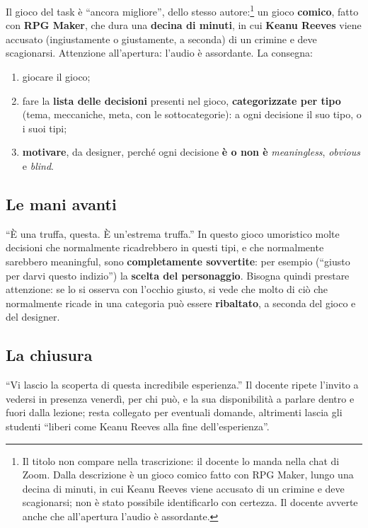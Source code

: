 Il gioco del task è ``ancora migliore'', dello stesso autore:\footnote{Il
titolo non compare nella trascrizione: il docente lo manda nella chat di
Zoom. Dalla descrizione è un gioco comico fatto con RPG Maker, lungo una
decina di minuti, in cui Keanu Reeves viene accusato di un crimine e deve
scagionarsi; non è stato possibile identificarlo con certezza. Il docente
avverte anche che all'apertura l'audio è assordante.} un gioco
\textbf{comico}, fatto con \textbf{RPG Maker}, che dura una
\textbf{decina di minuti}, in cui \textbf{Keanu Reeves} viene accusato
(ingiustamente o giustamente, a seconda) di un crimine e deve scagionarsi.
Attenzione all'apertura: l'audio è assordante. La consegna:
\begin{enumerate}
  \item giocare il gioco;
  \item fare la \textbf{lista delle decisioni} presenti nel gioco,
        \textbf{categorizzate per tipo} (tema, meccaniche, meta, con le
        sottocategorie): a ogni decisione il suo tipo, o i suoi tipi;
  \item \textbf{motivare}, da designer, perché ogni decisione \textbf{è o
        non è} \emph{meaningless}, \emph{obvious} e \emph{blind}.
\end{enumerate}

\subsection{Le mani avanti}

``È una truffa, questa. È un'estrema truffa.'' In questo gioco umoristico
molte decisioni che normalmente ricadrebbero in questi tipi, e che
normalmente sarebbero meaningful, sono \textbf{completamente sovvertite}:
per esempio (``giusto per darvi questo indizio'') la \textbf{scelta del
personaggio}. Bisogna quindi prestare attenzione: se lo si osserva con
l'occhio giusto, si vede che molto di ciò che normalmente ricade in una
categoria può essere \textbf{ribaltato}, a seconda del gioco e del designer.

\subsection{La chiusura}

``Vi lascio la scoperta di questa incredibile esperienza.'' Il docente
ripete l'invito a vedersi in presenza venerdì, per chi può, e la sua
disponibilità a parlare dentro e fuori dalla lezione; resta collegato per
eventuali domande, altrimenti lascia gli studenti ``liberi come Keanu Reeves
alla fine dell'esperienza''.

